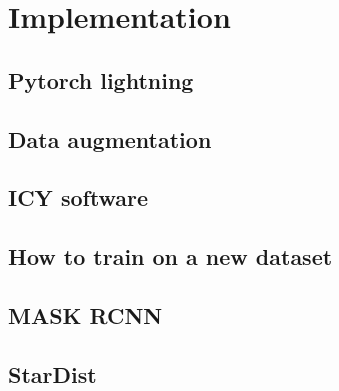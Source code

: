 \documentclass[main.tex]{subfiles}
\begin{document}
\chapter{Implementation}
\section{Pytorch lightning}
\section{Data augmentation}
\section{ICY software}
\section{How to train on a new dataset}
\section{MASK RCNN}
\section{StarDist}
\end{document}
